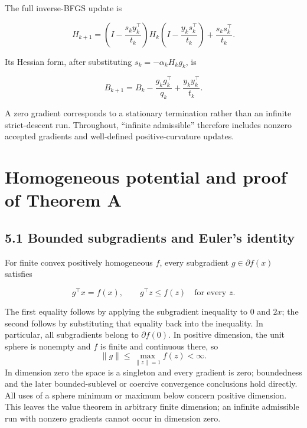 The full inverse-BFGS update is

\[
H_{k+1}=
\left(I-\frac{s_ky_k^\top}{t_k}\right)
H_k
\left(I-\frac{y_ks_k^\top}{t_k}\right)
+\frac{s_ks_k^\top}{t_k}.
\]

Its Hessian form, after substituting \(s_k=-\alpha_kH_kg_k\), is

\[
\boxed{B_{k+1}=B_k-\frac{g_kg_k^\top}{q_k}
+\frac{y_ky_k^\top}{t_k}.}
\tag{H.2.1}
\]

A zero gradient corresponds to a stationary termination rather than an
infinite strict-descent run. Throughout, ``infinite admissible''
therefore includes nonzero accepted gradients and well-defined
positive-curvature updates.



\setcounter{section}{4}
\setcounter{theorem}{0}
\setcounter{lemma}{0}
\setcounter{corollary}{0}
\setcounter{proposition}{0}
\setcounter{remark}{0}
\setcounter{equation}{0}
\section{Homogeneous potential and proof of Theorem
A}\label{H:homogeneous-potential-and-proof-of-theorem-a}

\subsection{5.1 Bounded subgradients and Euler's
identity}\label{H:bounded-subgradients-and-eulers-identity}

For finite convex positively homogeneous \(f\), every subgradient
\(g\in\partial f(x)\) satisfies

\[
g^\top x=f(x),\qquad g^\top z\le f(z)\quad\text{for every }z.
\]

The first equality follows by applying the subgradient inequality to
\(0\) and \(2x\); the second follows by substituting that equality back
into the inequality. In particular, all subgradients belong to
\(\partial f(0)\). In positive dimension, the unit sphere is nonempty and \(f\) is finite and continuous there, so
\[
\|g\|\le\max_{\|z\|=1}f(z)<\infty.
\]
In dimension zero the space is a singleton and every gradient is zero; boundedness and the later bounded-sublevel or coercive convergence conclusions hold directly. All uses of a sphere minimum or maximum below concern positive dimension. This leaves the value theorem in arbitrary finite dimension; an infinite admissible run with nonzero gradients cannot occur in dimension zero.

